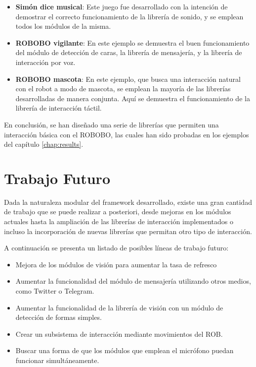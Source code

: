  \begin{itemize}
 	\item \textbf{Simón dice musical}: Este juego fue desarrollado con la intención de demostrar el correcto funcionamiento de la librería de sonido, y se emplean todos los módulos de la misma.
 	\item \textbf{ROBOBO vigilante}: En este ejemplo se demuestra el buen funcionamiento del módulo de detección de caras, la librería de mensajería, y la librería de interacción por voz.
 	\item \textbf{ROBOBO mascota}: En este ejemplo, que busca una interacción natural con el robot a modo de mascota, se emplean la mayoría de las librerías desarrolladas de manera conjunta. Aquí se demuestra el funcionamiento de la librería de interacción táctil.
 \end{itemize}
 
 En conclusión, se han diseñado una serie de librerías que permiten una interacción básica con el ROBOBO, las cuales han sido probadas en los ejemplos del capítulo \ref{chap:results}.
 
 
 \newpage
 
\section{Trabajo Futuro}

Dada la naturaleza modular del framework desarrollado, existe una gran cantidad de trabajo que se puede realizar a posteriori, desde mejoras en los módulos actuales hasta la ampliación de las librerías de interacción implementados o incluso la incorporación de nuevas librerías que permitan otro tipo de interacción.

A continuación se presenta un listado de posibles líneas de trabajo futuro:
\begin{itemize}
	\item Mejora de los módulos de visión para aumentar la tasa de refresco
	\item Aumentar la funcionalidad del módulo de mensajería utilizando otros medios, como Twitter o Telegram.
	\item Aumentar la funcionalidad de la librería de visión con un módulo de detección de formas simples.
	\item Crear un subsistema de interacción mediante movimientos del ROB.
	\item Buscar una forma de que los módulos que emplean el micrófono puedan funcionar simultáneamente.
\end{itemize}